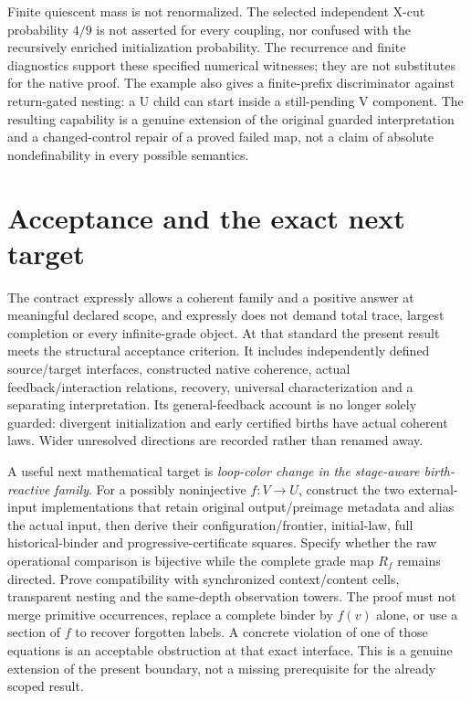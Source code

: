 \documentclass[11pt]{article}
\begin{document}
Finite quiescent mass is not renormalized. The selected independent X-cut probability $4/9$ is not asserted for every coupling, nor confused with the recursively enriched initialization probability. The recurrence and finite diagnostics support these specified numerical witnesses; they are not substitutes for the native proof. The example also gives a finite-prefix discriminator against return-gated nesting: a U child can start inside a still-pending V component. The resulting capability is a genuine extension of the original guarded interpretation and a changed-control repair of a proved failed map, not a claim of absolute nondefinability in every possible semantics.

\section{Acceptance and the exact next target}
The contract expressly allows a coherent family and a positive answer at meaningful declared scope, and expressly does not demand total trace, largest completion or every infinite-grade object. At that standard the present result meets the structural acceptance criterion. It includes independently defined source/target interfaces, constructed native coherence, actual feedback/interaction relations, recovery, universal characterization and a separating interpretation. Its general-feedback account is no longer solely guarded: divergent initialization and early certified births have actual coherent laws. Wider unresolved directions are recorded rather than renamed away.

A useful next mathematical target is \emph{loop-color change in the stage-aware birth-reactive family}. For a possibly noninjective $f:V\to U$, construct the two external-input implementations that retain original output/preimage metadata and alias the actual input, then derive their configuration/frontier, initial-law, full historical-binder and progressive-certificate squares. Specify whether the raw operational comparison is bijective while the complete grade map $R_f$ remains directed. Prove compatibility with synchronized context/content cells, transparent nesting and the same-depth observation towers. The proof must not merge primitive occurrences, replace a complete binder by $f(v)$ alone, or use a section of $f$ to recover forgotten labels. A concrete violation of one of those equations is an acceptable obstruction at that exact interface. This is a genuine extension of the present boundary, not a missing prerequisite for the already scoped result.
\end{document}
